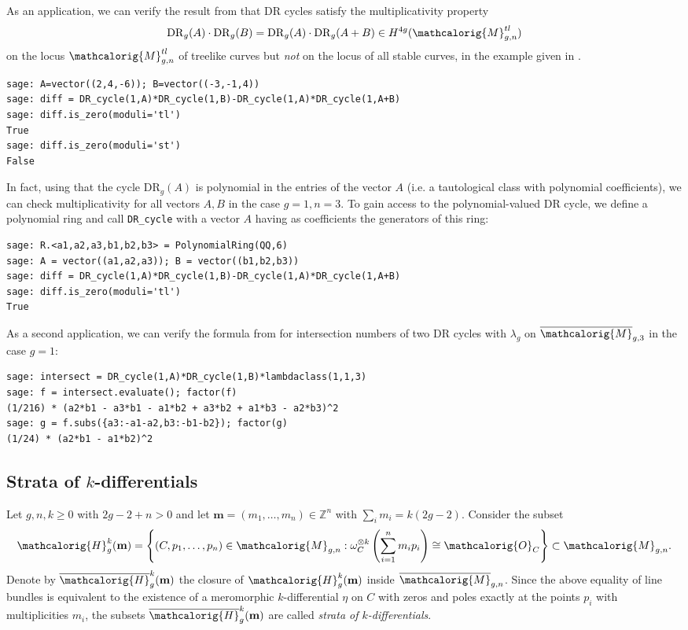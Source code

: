 \documentclass[11pt]{article}
\newcommand{\M}{\ensuremath{\overline{\mathcalorig{M}}}}
\newcommand{\DR}{\mathrm{DR}}
\begin{document}
As an application, we can verify the result from \cite{HPS} that DR cycles
satisfy the multiplicativity property
\[\DR_g(A) \cdot \DR_g(B) = \DR_g(A) \cdot \DR_g(A+B) \in H^{4g}(\mathcalorig{M}_{g,n}^{tl})\]
on the locus $\mathcalorig{M}_{g,n}^{tl}$ of treelike curves but \emph{not} on the locus of all stable curves, in the example given in \cite[Section 8]{HPS}.
\begin{lstlisting}
sage: A=vector((2,4,-6)); B=vector((-3,-1,4))
sage: diff = DR_cycle(1,A)*DR_cycle(1,B)-DR_cycle(1,A)*DR_cycle(1,A+B)
sage: diff.is_zero(moduli='tl')
True
sage: diff.is_zero(moduli='st')
False
\end{lstlisting}
In fact, using that the cycle $\DR_g(A)$ is polynomial in the entries of the vector $A$ (i.e. a tautological class with polynomial coefficients), we can check multiplicativity for all vectors $A,B$ in the case $g=1, n=3$. To gain access to the polynomial-valued DR cycle, we define a polynomial ring and call \verb|DR_cycle| with a vector $A$ having as coefficients the generators of this ring:
\begin{lstlisting}
sage: R.<a1,a2,a3,b1,b2,b3> = PolynomialRing(QQ,6)
sage: A = vector((a1,a2,a3)); B = vector((b1,b2,b3))
sage: diff = DR_cycle(1,A)*DR_cycle(1,B)-DR_cycle(1,A)*DR_cycle(1,A+B)
sage: diff.is_zero(moduli='tl')
True
\end{lstlisting}
As a second application, we can verify the formula from \cite[Theorem 2.1]{rossiburyak} for intersection numbers of two DR cycles with $\lambda_g$ on $\M_{g,3}$ in the case $g=1$:
\begin{lstlisting}
sage: intersect = DR_cycle(1,A)*DR_cycle(1,B)*lambdaclass(1,1,3)
sage: f = intersect.evaluate(); factor(f)
(1/216) * (a2*b1 - a3*b1 - a1*b2 + a3*b2 + a1*b3 - a2*b3)^2
sage: g = f.subs({a3:-a1-a2,b3:-b1-b2}); factor(g)
(1/24) * (a2*b1 - a1*b2)^2
\end{lstlisting}

\subsection{Strata of \texorpdfstring{$k$}{k}-differentials}
Let $g,n,k \geq 0$ with $2g-2+n>0$ and let $\textbf{m} = (m_1, \ldots, m_n) \in \mathbb{Z}^n$ with $\sum_i m_i = k(2g-2)$. Consider the subset
\[\mathcalorig{H}_g^k(\textbf{m}) = \left\{(C,p_1, \ldots, p_n) \in \mathcalorig{M}_{g,n} : \omega_C^{\otimes k}\left(\sum_{i=1}^n m_i p_i \right) \cong \mathcalorig{O}_C \right\} \subset \mathcalorig{M}_{g,n}.\]
Denote by $\overline{\mathcalorig{H}}_g^k(\textbf{m})$ the closure of $\mathcalorig{H}_g^k(\textbf{m})$ inside $\M_{g,n}$. Since the above equality of line bundles is equivalent to the existence of a meromorphic $k$-differential $\eta$ on $C$ with zeros and poles exactly at the points $p_i$ with multiplicities $m_i$, the subsets $\overline{\mathcalorig{H}}_g^k(\textbf{m})$ are called \emph{strata of $k$-differentials}.
\end{document}
